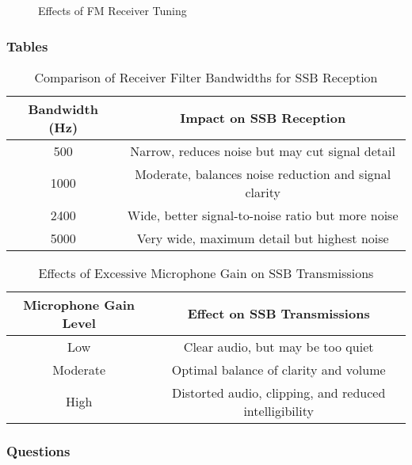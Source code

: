 \begin{figure}[h]
    \centering
    \caption{Effects of FM Receiver Tuning}
    \label{fig:fm-tuning}
\end{figure}

\subsubsection*{Tables}

\begin{table}[h]
    \centering
    \caption{Comparison of Receiver Filter Bandwidths for SSB Reception}
    \label{tab:filter-bandwidth-comparison}
    \begin{tabular}{|c|c|}
        \hline
        \textbf{Bandwidth (Hz)} & \textbf{Impact on SSB Reception} \\
        \hline
        500 & Narrow, reduces noise but may cut signal detail \\
        1000 & Moderate, balances noise reduction and signal clarity \\
        2400 & Wide, better signal-to-noise ratio but more noise \\
        5000 & Very wide, maximum detail but highest noise \\
        \hline
    \end{tabular}
\end{table}

\begin{table}[h]
    \centering
    \caption{Effects of Excessive Microphone Gain on SSB Transmissions}
    \label{tab:mic-gain-effects}
    \begin{tabular}{|c|c|}
        \hline
        \textbf{Microphone Gain Level} & \textbf{Effect on SSB Transmissions} \\
        \hline
        Low & Clear audio, but may be too quiet \\
        Moderate & Optimal balance of clarity and volume \\
        High & Distorted audio, clipping, and reduced intelligibility \\
        \hline
    \end{tabular}
\end{table}

\subsubsection{Questions}

